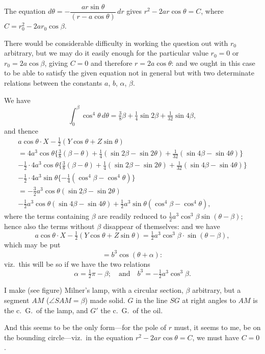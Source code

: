 \documentclass[11pt,a4paper]{book}
\begin{document}
The equation $d\theta = -\dfrac{ar\sin\theta}{(r-a\cos\theta)}\,dr$ gives $r^2 - 2ar\cos\theta = C$, where $C = r_0^2 - 2ar_0\cos\beta$.

There would be considerable difficulty in working the question out with $r_0$ arbitrary, but we may do it easily enough for the particular value $r_0 = 0$ or $r_0 = 2a\cos\beta$, giving $C = 0$ and therefore $r = 2a\cos\theta$: and we ought in this case to be able to satisfy the given equation not in general but with two determinate relations between the constants $a$, $b$, $\alpha$, $\beta$.

We have
\[
\int_0^\beta \cos^4\theta\,d\theta = \tfrac{3}{8}\beta + \tfrac{1}{4}\sin 2\beta + \tfrac{1}{32}\sin 4\beta,
\]
and thence
\begin{multline*}
a\cos\theta \cdot X - \tfrac{1}{2}(Y\cos\theta + Z\sin\theta) \\
= 4a^3\cos\theta\{\tfrac{3}{8}(\beta-\theta) + \tfrac{1}{4}(\sin 2\beta - \sin 2\theta) + \tfrac{1}{32}(\sin 4\beta - \sin 4\theta)\} \\
- \tfrac{1}{2} \cdot 4a^3\cos\theta\{\tfrac{3}{8}(\beta-\theta) + \tfrac{1}{4}(\sin 2\beta - \sin 2\theta) + \tfrac{1}{32}(\sin 4\beta - \sin 4\theta)\} \\
- \tfrac{1}{2} \cdot 4a^3\sin\theta\{-\tfrac{1}{4}(\cos^4\beta - \cos^4\theta)\} \\
= -\tfrac{3}{2}a^3\cos\theta(\sin 2\beta - \sin 2\theta) \\
-\tfrac{1}{2}a^3\cos\theta(\sin 4\beta - \sin 4\theta) + \tfrac{1}{2}a^3\sin\theta(\cos^4\beta - \cos^4\theta),
\end{multline*}
where the terms containing $\beta$ are readily reduced to $\tfrac{1}{2}a^3\cos^3\beta \sin(\theta-\beta)$; hence also the terms without $\beta$ disappear of themselves: and we have
\[
a\cos\theta \cdot X - \tfrac{1}{2}(Y\cos\theta + Z\sin\theta) = \tfrac{1}{2}a^3\cos^3\beta \cdot \sin(\theta - \beta),
\]
which may be put
\[
= b^3\cos(\theta + \alpha):
\]
viz.\ this will be so if we have the two relations
\[
\alpha = \tfrac{1}{2}\pi - \beta;\quad \text{and}\quad b^3 = -\tfrac{1}{2}a^3\cos^3\beta.
\]

I make (see figure) Milner's lamp, with a circular section, $\beta$ arbitrary, but a segment $AM$ ($\angle SAM = \beta$) made solid. $G$ in the line $SG$ at right angles to $AM$ is the c.\ G.\ of the lamp, and $G'$ the c.\ G.\ of the oil.

And this seems to be the only form---for the pole of $r$ must, it seems to me, be on the bounding circle---viz.\ in the equation $r^2 - 2ar\cos\theta = C$, we must have $C=0$.
\end{document}
